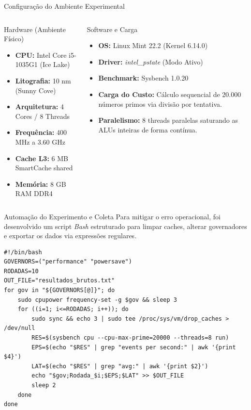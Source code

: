 \documentclass[aspectratio=169,10pt]{beamer}
\begin{document}
\begin{frame}{Configuração do Ambiente Experimental}
    \begin{columns}[T]
        \begin{block}{Hardware (Ambiente Físico)}
            \begin{itemize}
                \item \textbf{CPU:} Intel Core i5-1035G1 (Ice Lake)
                \item \textbf{Litografia:} 10 nm (Sunny Cove)
                \item \textbf{Arquitetura:} 4 Cores / 8 Threads
                \item \textbf{Frequência:} 400 MHz a 3.60 GHz
                \item \textbf{Cache L3:} 6 MB SmartCache shared
                \item \textbf{Memória:} 8 GB RAM DDR4
            \end{itemize}
        \end{block}

        \begin{block}{Software e Carga}
            \begin{itemize}
                \item \textbf{OS:} Linux Mint 22.2 (Kernel 6.14.0)
                \item \textbf{Driver:} \textit{intel\_pstate} (Modo Ativo)
                \item \textbf{Benchmark:} Sysbench 1.0.20
                \item \textbf{Carga do Custo:} Cálculo sequencial de 20.000 números primos via divisão por tentativa.
                \item \textbf{Paralelismo:} 8 threads paralelas saturando as ALUs inteiras de forma contínua.
            \end{itemize}
        \end{block}
    \end{columns}
\end{frame}

\begin{frame}[fragile]{Automação do Experimento e Coleta}
    Para mitigar o erro operacional, foi desenvolvido um script \textit{Bash} estruturado para limpar caches, alterar governadores e exportar os dados via expressões regulares.

    \begin{lstlisting}[caption=Script de Automação Utilizado para Isolar e Coletar os Dados]
#!/bin/bash
GOVERNORS=("performance" "powersave")
RODADAS=10
OUT_FILE="resultados_brutos.txt"
for gov in "${GOVERNORS[@]}"; do
    sudo cpupower frequency-set -g $gov && sleep 3
    for ((i=1; i<=RODADAS; i++)); do
        sudo sync && echo 3 | sudo tee /proc/sys/vm/drop_caches > /dev/null
        RES=$(sysbench cpu --cpu-max-prime=20000 --threads=8 run)
        EPS=$(echo "$RES" | grep "events per second:" | awk '{print $4}')
        LAT=$(echo "$RES" | grep "avg:" | awk '{print $2}')
        echo "$gov;Rodada_$i;$EPS;$LAT" >> $OUT_FILE
        sleep 2
    done
done
    \end{lstlisting}
\end{frame}
\end{document}

